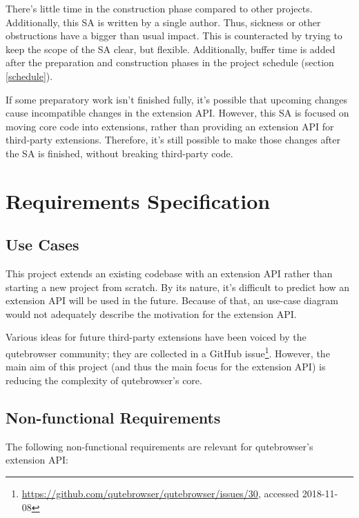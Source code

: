 \documentclass[a4paper,parskip=full]{scrreprt}
\begin{document}
There's little time in the construction phase compared to other projects.
Additionally, this SA is written by a single author. Thus, sickness or other
obstructions have a bigger than usual impact. This is counteracted by trying to
keep the scope of the SA clear, but flexible. Additionally, buffer time is
added after the preparation and construction phases in the project schedule
(section \ref{schedule}).

If some preparatory work isn't finished fully, it's possible that upcoming
changes cause incompatible changes in the extension API. However, this SA
is focused on moving core code into extensions, rather than providing an
extension API for third-party extensions. Therefore, it's still possible to make
those changes after the SA is finished, without breaking third-party code.


\chapter{Requirements Specification}
\label{ch:requirements}

\section{Use Cases}

This project extends an existing codebase with an extension API rather
than starting a new project from scratch. By its nature, it's difficult to
predict how an extension API will be used in the future. Because of that, an
use-case diagram would not adequately describe the motivation for the extension
API.

Various ideas for future third-party extensions have been voiced by the
qutebrowser community; they are collected in a GitHub
issue\footnote{\url{https://github.com/qutebrowser/qutebrowser/issues/30},
  accessed 2018-11-08}. However, the main aim of this project (and thus the main
focus for the extension API) is reducing the complexity of qutebrowser's core.


\section{Non-functional Requirements}
The following non-functional requirements are relevant for qutebrowser's
extension API:
\end{document}
